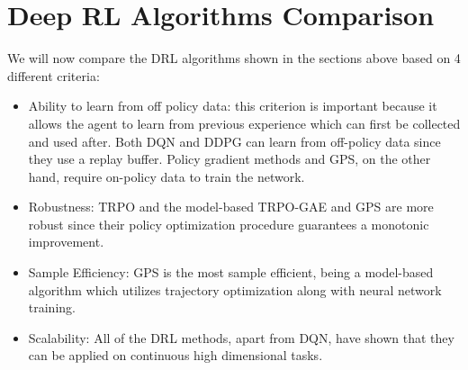 \section{Deep RL Algorithms Comparison}

We will now compare the DRL algorithms shown in the sections above based on 4 different criteria:

\begin{itemize}
	
	\item Ability to learn from off policy data: this criterion is important because it allows the agent to learn from previous experience which can first be collected and used after. Both DQN and DDPG can learn from off-policy data since they use a replay buffer. Policy gradient methods and GPS, on the other hand, require on-policy data to train the network.
	
	\item Robustness: TRPO and the model-based TRPO-GAE and GPS are more robust since their policy optimization procedure guarantees a monotonic improvement.
	
	\item Sample Efficiency: GPS is the most sample efficient, being a model-based algorithm which utilizes trajectory optimization along with neural network training.
	
	\item Scalability: All of the DRL methods, apart from DQN, have shown that they can be applied on continuous high dimensional tasks.

	
\end{itemize}